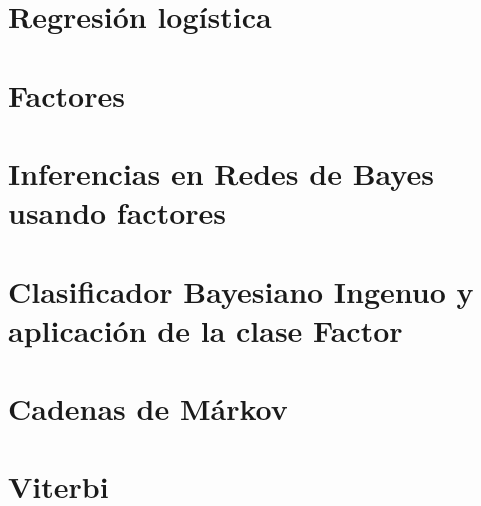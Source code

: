 \documentclass[12pt,openany]{book}
\begin{document}





\chapter{Regresión logística}






\chapter{Factores}





\chapter[Inferencia]{Inferencias en Redes de Bayes usando factores}





\chapter[Bayes Ingenuo]{Clasificador Bayesiano Ingenuo y aplicación de la clase Factor}





\chapter{Cadenas de Márkov}





\chapter{Viterbi}
\end{document}

